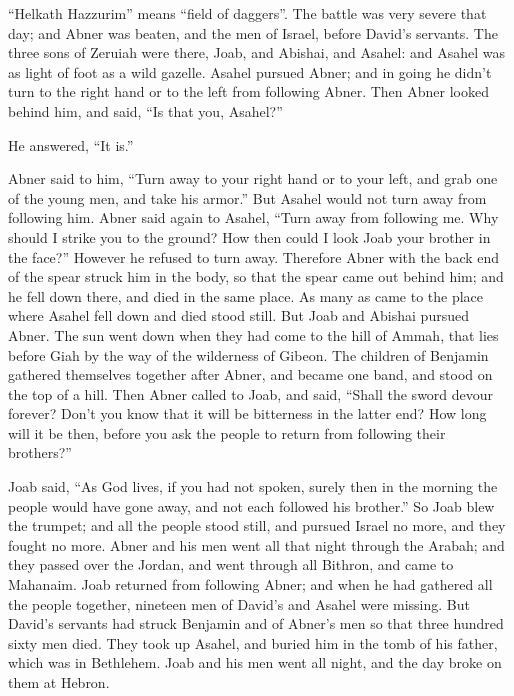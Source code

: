 {{“Helkath Hazzurim” means “field of daggers”.}
The battle was very severe that day; and Abner was beaten, and the men of Israel, before David’s servants.
The three sons of Zeruiah were there, Joab, and Abishai, and Asahel: and Asahel was as light of foot as a wild gazelle.
Asahel pursued Abner; and in going he didn’t turn to the right hand or to the left from following Abner.
Then Abner looked behind him, and said, “Is that you, Asahel?”
\par }{\PP He answered, “It is.”
\par }{\PP {}Abner said to him, “Turn away to your right hand or to your left, and grab one of the young men, and take his armor.” But Asahel would not turn away from following him.
Abner said again to Asahel, “Turn away from following me. Why should I strike you to the ground? How then could I look Joab your brother in the face?”
However he refused to turn away. Therefore Abner with the back end of the spear struck him in the body, so that the spear came out behind him; and he fell down there, and died in the same place. As many as came to the place where Asahel fell down and died stood still.
But Joab and Abishai pursued Abner. The sun went down when they had come to the hill of Ammah, that lies before Giah by the way of the wilderness of Gibeon.
The children of Benjamin gathered themselves together after Abner, and became one band, and stood on the top of a hill.
Then Abner called to Joab, and said, “Shall the sword devour forever? Don’t you know that it will be bitterness in the latter end? How long will it be then, before you ask the people to return from following their brothers?”
\par }{\PP {}Joab said, “As God lives, if you had not spoken, surely then in the morning the people would have gone away, and not each followed his brother.”
So Joab blew the trumpet; and all the people stood still, and pursued Israel no more, and they fought no more.
Abner and his men went all that night through the Arabah; and they passed over the Jordan, and went through all Bithron, and came to Mahanaim.
Joab returned from following Abner; and when he had gathered all the people together, nineteen men of David’s and Asahel were missing.
But David’s servants had struck Benjamin and of Abner’s men so that three hundred sixty men died.
They took up Asahel, and buried him in the tomb of his father, which was in Bethlehem. Joab and his men went all night, and the day broke on them at Hebron.

}
